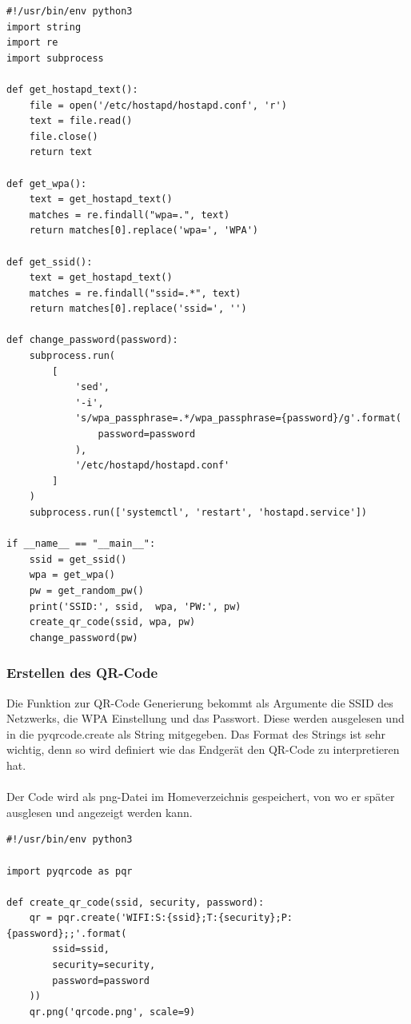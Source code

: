 \documentclass[a4paper,11pt,singlespacing]{article}
\begin{document}

\begin{lstlisting}
#!/usr/bin/env python3
import string
import re
import subprocess	

def get_hostapd_text():
    file = open('/etc/hostapd/hostapd.conf', 'r')
    text = file.read()
    file.close()
    return text

def get_wpa():
    text = get_hostapd_text()
    matches = re.findall("wpa=.", text)
    return matches[0].replace('wpa=', 'WPA')

def get_ssid():
    text = get_hostapd_text()
    matches = re.findall("ssid=.*", text)
    return matches[0].replace('ssid=', '')
    
def change_password(password):
    subprocess.run(
        [
            'sed',
            '-i',
            's/wpa_passphrase=.*/wpa_passphrase={password}/g'.format(
                password=password
            ),
            '/etc/hostapd/hostapd.conf'
        ]
    )
    subprocess.run(['systemctl', 'restart', 'hostapd.service'])
    
if __name__ == "__main__":
    ssid = get_ssid()
    wpa = get_wpa()
    pw = get_random_pw()
    print('SSID:', ssid,  wpa, 'PW:', pw)
    create_qr_code(ssid, wpa, pw)
    change_password(pw)

\end{lstlisting}
    	
    		\subsubsection{Erstellen des QR-Code}
    				Die Funktion zur QR-Code Generierung bekommt als Argumente die SSID des Netzwerks, die WPA Einstellung und das Passwort. Diese werden ausgelesen und in die pyqrcode.create als String mitgegeben. Das Format des Strings ist sehr wichtig, denn so wird definiert wie das Endgerät den QR-Code zu interpretieren hat.  \\ \\
				Der Code wird als png-Datei im Homeverzeichnis gespeichert, von wo er später ausglesen und angezeigt werden kann.\\ 


\begin{lstlisting}
#!/usr/bin/env python3

import pyqrcode as pqr
	
def create_qr_code(ssid, security, password):
    qr = pqr.create('WIFI:S:{ssid};T:{security};P:{password};;'.format(
        ssid=ssid,
        security=security,
        password=password
    ))
    qr.png('qrcode.png', scale=9)
    
\end{lstlisting}
    	
\end{document}

